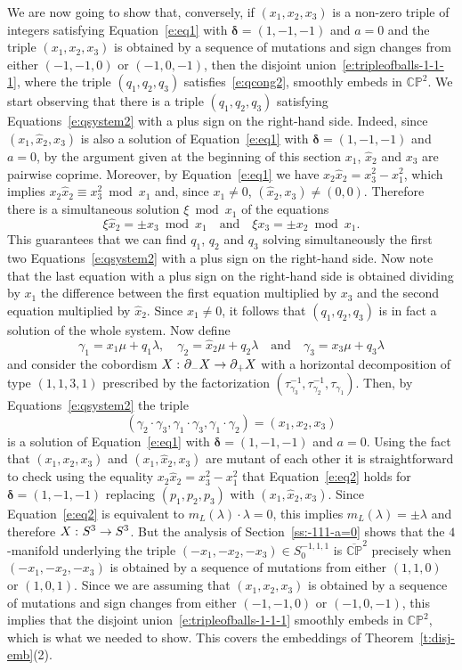 \documentclass[11pt,a4paper]{amsart}
\newcommand{\CP}{\mathbb{CP}}
\newcommand{\de}{\delta}
\newcommand{\ga}{\gamma}
\newcommand{\la}{\lambda}
\newcommand{\del}{\partial}
\newcommand{\co}{\thinspace\colon}
\newcommand{\bde}{\bm{\de}}
\theoremstyle{definition}
\numberwithin{equation}{section}
\begin{document}
We are now going to show that, conversely, if 
$(x_1,x_2,x_3)$ is a non-zero triple of integers satisfying 
Equation~\eqref{e:eq1} with $\bde = (1,-1,-1)$ and $a=0$ and the triple $(x_1,x_2,x_3)$  
is obtained by a sequence of mutations and sign changes from either 
$(-1,-1,0)$ or $(-1,0,-1)$, then the disjoint union~\eqref{e:tripleofballs-1-1-1}, 
where the triple $(q_1,q_2,q_3)$ satisfies~\eqref{e:qcong2}, smoothly embeds in $\CP^2$.
We start observing that there is a triple $(q_1,q_2,q_3)$ satisfying 
Equations~\eqref{e:qsystem2} with a plus sign on the right-hand side. 
Indeed, since $(x_1,\hat x_2,x_3)$ is also a solution of Equation~\eqref{e:eq1} with 
$\bde = (1,-1,-1)$ and $a=0$, by the argument given at the beginning of this section 
$x_1$, $\hat x_2$ and $x_3$ are pairwise coprime. Moreover, 
by Equation~\eqref{e:eq1} we have $x_2 \hat x_2=x_3^2-x_1^2$, which implies 
$x_2 \hat x_2\equiv x_3^2\bmod x_1$ and, since $x_1\neq 0$, $(\hat x_2, x_3)\neq (0,0)$.  
Therefore there is a simultaneous solution $\xi\bmod x_1$ of the equations 
\[
\xi\hat x_2 = \pm x_3\bmod x_1\quad\text{and}\quad\xi x_3 = \pm x_2\bmod x_1.
\]
This guarantees that we can find $q_1$, $q_2$ and $q_3$ 
solving simultaneously the first two Equations~\eqref{e:qsystem2} with a plus sign 
on the right-hand side. Now note that the last equation with a plus sign on the right-hand 
side is obtained dividing by $x_1$ the difference 
between the first equation multiplied by $x_3$ and the second equation multiplied 
by $\hat x_2$. Since $x_1\neq 0$, it follows that $(q_1,q_2,q_3)$ is in fact 
a solution of the whole system. Now define 
\[
\ga_1 = x_1\mu+q_1\la,\quad \ga_2 = \hat x_2\mu+q_2\la\quad\text{and}\quad
\ga_3 = x_3\mu+q_3\la 
\]
and consider the cobordism $X\co\del_- X\to\del_+ X$ with a 
horizontal decomposition of type $(1,1,3,1)$ prescribed  
by the factorization $(\tau_{\ga_3}^{-1},\tau_{\ga_2}^{-1},\tau_{\ga_1})$. 
Then, by Equations~\eqref{e:qsystem2} the triple 
\[
(\ga_2\cdot\ga_3, \ga_1\cdot\ga_3,\ga_1\cdot\ga_2) = (x_1,x_2,x_3)
\]
is a solution of Equation~\eqref{e:eq1} with $\bde = (1,-1,-1)$ and $a=0$.
Using the fact that $(x_1,x_2,x_3)$ and $(x_1,\hat x_2,x_3)$ 
are mutant of each other it is straightforward to check using the equality 
$x_2\hat x_2 = x_3^2-x_1^2$ that Equation~\eqref{e:eq2} holds for $\bde = (1,-1,-1)$ replacing $(p_1,p_2,p_3)$ with $(x_1,\hat x_2,x_3)$. 
Since Equation~\eqref{e:eq2} is equivalent to $m_L(\la)\cdot\la=0$, 
this implies $m_L(\la) = \pm \la$ and therefore $X\co S^3\to S^3$. 
But the analysis of Section~\ref{ss:-111-a=0} shows that the $4$-manifold underlying 
the triple $(-x_1,-x_2,-x_3)\in S^{-1,1,1}_0$ is $\overline{\CP}^2$ precisely 
when $(-x_1,-x_2,-x_3)$ is obtained by a sequence of mutations from either 
$(1,1,0)$ or $(1,0,1)$. Since we are assuming that $(x_1,x_2,x_3)$ is 
obtained by a sequence of mutations and sign changes from either 
$(-1,-1,0)$ or $(-1,0,-1)$, this implies that the disjoint union~\eqref{e:tripleofballs-1-1-1} 
smoothly embeds in $\CP^2$, which is what we needed to show.
This covers the embeddings of Theorem~\ref{t:disj-emb}(2).
\end{document}
